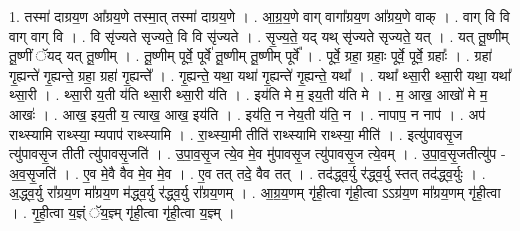 \documentclass[17pt]{extarticle}
\begin{document}
1. तस्मा॑ दाग्रय॒ण आ᳚ग्रय॒णे तस्मा॒त् तस्मा॑ दाग्रय॒णे । . आ॒ग्र॒य॒णे वाग् वागा᳚ग्रय॒ण आ᳚ग्रय॒णे वाक् । . वाग् वि वि वाग् वाग् वि । . वि सृ॑ज्यते सृज्यते॒ वि वि सृ॑ज्यते । . सृ॒ज्य॒ते॒ यद् यथ् सृ॑ज्यते सृज्यते॒ यत् । . यत् तू॒ष्णीम् तू॒ष्णीं ॅयद् यत् तू॒ष्णीम् । . तू॒ष्णीम् पूर्वे॒ पूर्वे॑ तू॒ष्णीम् तू॒ष्णीम् पूर्वे᳚ । . पूर्वे॒ ग्रहा॒ ग्रहाः॒ पूर्वे॒ पूर्वे॒ ग्रहाः᳚ । . ग्रहा॑ गृ॒ह्यन्ते॑ गृ॒ह्यन्ते॒ ग्रहा॒ ग्रहा॑ गृ॒ह्यन्ते᳚ । . गृ॒ह्यन्ते॒ यथा॒ यथा॑ गृ॒ह्यन्ते॑ गृ॒ह्यन्ते॒ यथा᳚ । . यथा᳚ थ्सा॒री थ्सा॒री यथा॒ यथा᳚ थ्सा॒री । . थ्सा॒री य॒ती य॑ति थ्सा॒री थ्सा॒री य॑ति । . इय॑ति मे म॒ इय॒ती य॑ति मे । . म॒ आख॒ आखो॑ मे म॒ आखः॑ । . आख॒ इय॒ती य॒ त्याख॒ आख॒ इय॑ति । . इय॑ति॒ न नेय॒ती य॑ति॒ न । . नापाप॒ न नाप॑ । . अप॑ राथ्स्यामि राथ्स्या॒ म्यपाप॑ राथ्स्यामि । . रा॒थ्स्या॒मी तीति॑ राथ्स्यामि राथ्स्या॒ मीति॑ । . इत्यु॑पावसृ॒ज त्यु॑पावसृ॒ज तीती त्यु॑पावसृ॒जति॑ । . उ॒पा॒व॒सृ॒ज त्ये॒व मे॒व मु॑पावसृ॒ज त्यु॑पावसृ॒ज त्ये॒वम् । . उ॒पा॒व॒सृ॒जतीत्यु॑प - अ॒व॒सृ॒जति॑ । . ए॒व मे॒वै वैव मे॒व मे॒व । . ए॒व तत् तदे॒ वैव तत् । . तद॑द्ध्व॒र्यु र॑द्ध्व॒र्यु स्तत् तद॑द्ध्व॒र्युः । . अ॒द्ध्व॒र्यु रा᳚ग्रय॒ण मा᳚ग्रय॒ण म॑द्ध्व॒र्यु र॑द्ध्व॒र्यु रा᳚ग्रय॒णम् । . आ॒ग्र॒य॒णम् गृ॑ही॒त्वा गृ॑ही॒त्वा ऽऽग्र॑य॒ण मा᳚ग्रय॒णम् गृ॑ही॒त्वा । . गृ॒ही॒त्वा य॒ज्ञ्ं ॅय॒ज्ञ्म् गृ॑ही॒त्वा गृ॑ही॒त्वा य॒ज्ञ्म् । \newline
\end{document}

